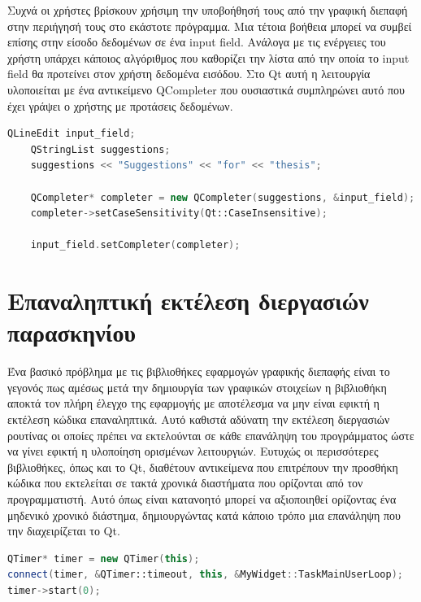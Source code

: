 Συχνά οι χρήστες βρίσκουν χρήσιμη την υποβοήθησή τους από την γραφική διεπαφή
στην περιήγησή τους στο εκάστοτε πρόγραμμα. Μια τέτοια βοήθεια μπορεί να συμβεί
επίσης στην είσοδο δεδομένων σε ένα input field. Ανάλογα με τις ενέργειες του
χρήστη υπάρχει κάποιος αλγόριθμος που καθορίζει την λίστα από την οποία το
input field θα προτείνει στον χρήστη δεδομένα εισόδου. Στο Qt αυτή η λειτουργία
υλοποιείται με ένα αντικείμενο QCompleter που ουσιαστικά συμπληρώνει αυτό που έχει
γράψει ο χρήστης με προτάσεις δεδομένων.

\begin{lstlisting}[language=C++, style=cppstyle]
    QLineEdit input_field;
    QStringList suggestions;
    suggestions << "Suggestions" << "for" << "thesis";
    
    QCompleter* completer = new QCompleter(suggestions, &input_field);
    completer->setCaseSensitivity(Qt::CaseInsensitive);
    
    input_field.setCompleter(completer);
\end{lstlisting}



\section{Επαναληπτική εκτέλεση διεργασιών παρασκηνίου}

Ένα βασικό πρόβλημα με τις βιβλιοθήκες εφαρμογών γραφικής διεπαφής είναι το γεγονός
πως αμέσως μετά την δημιουργία των γραφικών στοιχείων η βιβλιοθήκη αποκτά τον πλήρη
έλεγχο της εφαρμογής με αποτέλεσμα να μην είναι εφικτή η εκτέλεση κώδικα επαναληπτικά.
Αυτό καθιστά αδύνατη την εκτέλεση διεργασιών ρουτίνας οι οποίες πρέπει να εκτελούνται
σε κάθε επανάληψη του προγράμματος ώστε να γίνει εφικτή η υλοποίηση ορισμένων λειτουργιών.
Ευτυχώς οι περισσότερες βιβλιοθήκες, όπως και το Qt, διαθέτουν αντικείμενα που επιτρέπουν
την προσθήκη κώδικα που εκτελείται σε τακτά χρονικά διαστήματα που ορίζονται από τον
προγραμματιστή. Αυτό όπως είναι κατανοητό μπορεί να αξιοποιηθεί ορίζοντας ένα μηδενικό
χρονικό διάστημα, δημιουργώντας κατά κάποιο τρόπο μια επανάληψη που την διαχειρίζεται το
Qt.

 \begin{lstlisting}[language=C++, style=cppstyle]
QTimer* timer = new QTimer(this);
connect(timer, &QTimer::timeout, this, &MyWidget::TaskMainUserLoop);
timer->start(0);
\end{lstlisting}

